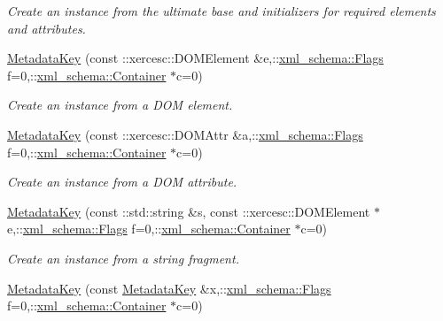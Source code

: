 \begin{DoxyCompactItemize}
\begin{DoxyCompactList}\small\item\em Create an instance from the ultimate base and initializers for required elements and attributes. \item\end{DoxyCompactList}\item 
\hyperlink{classopenstack_1_1xml_1_1MetadataKey_a6aca37153cce11e43d7fea32648337a8}{MetadataKey} (const ::xercesc::DOMElement \&e,::\hyperlink{namespacexml__schema_affb4c227cbd9aa7453dd1dc5a1401943}{xml\_\-schema::Flags} f=0,::\hyperlink{namespacexml__schema_a333dea2213742aea47a37532dec4ec27}{xml\_\-schema::Container} $\ast$c=0)
\begin{DoxyCompactList}\small\item\em Create an instance from a DOM element. \item\end{DoxyCompactList}\item 
\hyperlink{classopenstack_1_1xml_1_1MetadataKey_a2fb25881eaff0fbb3a472a476e5af598}{MetadataKey} (const ::xercesc::DOMAttr \&a,::\hyperlink{namespacexml__schema_affb4c227cbd9aa7453dd1dc5a1401943}{xml\_\-schema::Flags} f=0,::\hyperlink{namespacexml__schema_a333dea2213742aea47a37532dec4ec27}{xml\_\-schema::Container} $\ast$c=0)
\begin{DoxyCompactList}\small\item\em Create an instance from a DOM attribute. \item\end{DoxyCompactList}\item 
\hyperlink{classopenstack_1_1xml_1_1MetadataKey_a696ade9f6df4aeef9d783551e7c81030}{MetadataKey} (const ::std::string \&s, const ::xercesc::DOMElement $\ast$e,::\hyperlink{namespacexml__schema_affb4c227cbd9aa7453dd1dc5a1401943}{xml\_\-schema::Flags} f=0,::\hyperlink{namespacexml__schema_a333dea2213742aea47a37532dec4ec27}{xml\_\-schema::Container} $\ast$c=0)
\begin{DoxyCompactList}\small\item\em Create an instance from a string fragment. \item\end{DoxyCompactList}\item 
\hyperlink{classopenstack_1_1xml_1_1MetadataKey_aa399f482842fb436cf9edc4b286847fe}{MetadataKey} (const \hyperlink{classopenstack_1_1xml_1_1MetadataKey}{MetadataKey} \&x,::\hyperlink{namespacexml__schema_affb4c227cbd9aa7453dd1dc5a1401943}{xml\_\-schema::Flags} f=0,::\hyperlink{namespacexml__schema_a333dea2213742aea47a37532dec4ec27}{xml\_\-schema::Container} $\ast$c=0)

\end{DoxyCompactItemize}
